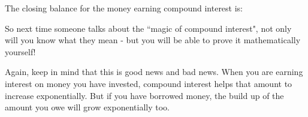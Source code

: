         \label{m39334*id73640}The closing balance for the money earning compound interest is:\par 
        \label{m39334*id73644}\nopagebreak\noindent{}
        \label{m39334*id73760}So next time someone talks about the ``magic of compound interest", not only will you know what they mean - but you will be able to prove it mathematically yourself!\par 
        \label{m39334*id73766}Again, keep in mind that this is good news and bad news. When you are earning interest on money you have invested, compound interest helps that amount to increase exponentially. But if you have borrowed money, the build up of the amount you owe will grow exponentially too.\par 
